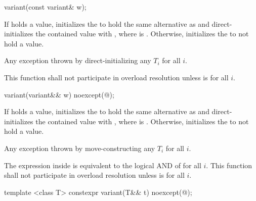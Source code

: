 %
\begin{itemdecl}
variant(const variant& w);
\end{itemdecl}

\begin{itemdescr}
\pnum
\effects
If  holds a value, initializes the  to hold the same
alternative as  and direct-initializes the contained value
with , where  is .
Otherwise, initializes the  to not hold a value.

\pnum
\throws
Any exception thrown by direct-initializing any $T_i$ for all $i$.

\pnum
\remarks
This function shall not participate in overload resolution unless
 is  for all $i$.
\end{itemdescr}

%
\begin{itemdecl}
variant(variant&& w) noexcept(@\seebelow@);
\end{itemdecl}

\begin{itemdescr}
\pnum
\effects
If  holds a value, initializes the  to hold the same
alternative as  and direct-initializes the contained value with
, where  is .
Otherwise, initializes the  to not hold a value.

\pnum
\throws
Any exception thrown by move-constructing any $T_i$ for all $i$.

\pnum
\remarks
The expression inside  is equivalent to the logical AND of
 for all $i$.
This function shall not participate in overload resolution unless
 is  for all $i$.
\end{itemdescr}

%
\begin{itemdecl}
template <class T> constexpr variant(T&& t) noexcept(@\seebelow@);
\end{itemdecl}

